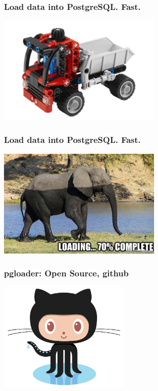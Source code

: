 \documentclass{beamer}
\begin{document}
\begin{frame}
  \frametitle{Load data into PostgreSQL. Fast.}


  \begin{center}
    \includegraphics[height=2.1in]{pgloader.jpg}
  \end{center}
\end{frame}

\begin{frame}
  \frametitle{Load data into PostgreSQL. Fast.}


  \begin{center}
    \includegraphics[height=2.1in]{elephant-loading.jpg}
  \end{center}
\end{frame}

\begin{frame}
  \frametitle{pgloader: Open Source, github}


  \begin{center}
    \includegraphics[height=2.1in]{Octocat.png}
  \end{center}
\end{frame}
\end{document}
